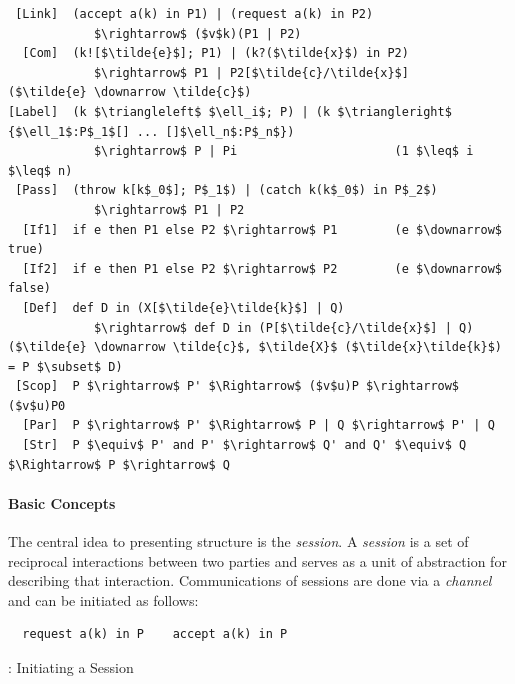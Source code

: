 \documentclass[11pt]{scrartcl}
\begin{document}
\begin{lstlisting}
 [Link]  (accept a(k) in P1) | (request a(k) in P2) 
            $\rightarrow$ ($v$k)(P1 | P2)
  [Com]  (k![$\tilde{e}$]; P1) | (k?($\tilde{x}$) in P2) 
            $\rightarrow$ P1 | P2[$\tilde{c}/\tilde{x}$]                   ($\tilde{e} \downarrow \tilde{c}$)
[Label]  (k $\triangleleft$ $\ell_i$; P) | (k $\triangleright$ {$\ell_1$:P$_1$[] ... []$\ell_n$:P$_n$}) 
            $\rightarrow$ P | Pi                      (1 $\leq$ i $\leq$ n)
 [Pass]  (throw k[k$_0$]; P$_1$) | (catch k(k$_0$) in P$_2$) 
            $\rightarrow$ P1 | P2
  [If1]  if e then P1 else P2 $\rightarrow$ P1        (e $\downarrow$ true)
  [If2]  if e then P1 else P2 $\rightarrow$ P2        (e $\downarrow$ false)
  [Def]  def D in (X[$\tilde{e}\tilde{k}$] | Q) 
            $\rightarrow$ def D in (P[$\tilde{c}/\tilde{x}$] | Q)          ($\tilde{e} \downarrow \tilde{c}$, $\tilde{X}$ ($\tilde{x}\tilde{k}$) = P $\subset$ D)
 [Scop]  P $\rightarrow$ P' $\Rightarrow$ ($v$u)P $\rightarrow$ ($v$u)P0
  [Par]  P $\rightarrow$ P' $\Rightarrow$ P | Q $\rightarrow$ P' | Q
  [Str]  P $\equiv$ P' and P' $\rightarrow$ Q' and Q' $\equiv$ Q $\Rightarrow$ P $\rightarrow$ Q
\end{lstlisting}

\paragraph{Basic Concepts}

The central idea to presenting structure is the \emph{session}. A \emph{session} 
is a set of reciprocal interactions between two parties and serves as a unit of 
abstraction for describing that interaction. Communications of sessions are done 
via a \emph{channel} and can be initiated as follows:

\begin{multicols}{2}

	\begin{minipage}{0.5\textwidth}
		\begin{verbatim}
  request a(k) in P    accept a(k) in P 
		\end{verbatim}
	\end{minipage}
	
	\begin{minipage}{0.5\textwidth}

\hspace*{15pt}: Initiating a Session
	\end{minipage}

\end{multicols}
\end{document}
